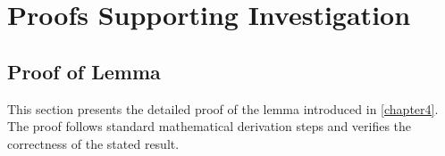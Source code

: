 \chapter{Proofs Supporting Investigation}
\label{appendix}

\section{Proof of Lemma}
\begin{paragraph}
This section presents the detailed proof of the lemma introduced in \autoref{chapter4}. The proof follows standard mathematical derivation steps and verifies the correctness of the stated result.
\end{paragraph}
